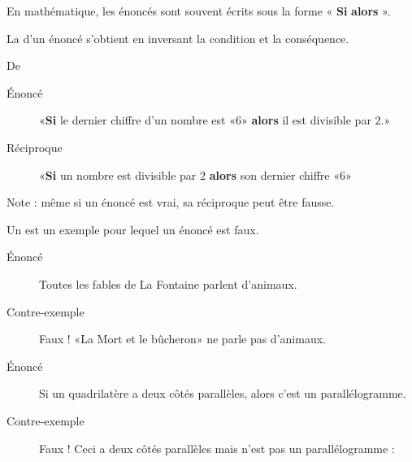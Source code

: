 
En mathématique, les énoncés sont souvent écrits sous la forme « {\bf Si}  {\bf alors} ».

\begin{definition}
    La  d'un énoncé s'obtient en inversant la condition et la conséquence.
\end{definition}
De \cite{XEFooQxuWQb}

\begin{example}
    \begin{description}
        \item[Énoncé] «{\bf Si} le dernier chiffre d'un nombre est «\( 6\)» {\bf alors} il est divisible par \( 2\).» 
        \item[Réciproque] «{\bf Si} un nombre est divisible par \( 2\) {\bf alors} son dernier chiffre «\( 6\)» 
    \end{description}
    Note : même si un énoncé est vrai, sa réciproque peut être fausse.
\end{example}

\begin{definition}
    Un  est un exemple pour lequel un énoncé est faux.
\end{definition}

\begin{example}
    \begin{description}
        \item[Énoncé] Toutes les fables de La Fontaine parlent d'animaux.
        \item[Contre-exemple] Faux ! «La Mort et le bûcheron» ne parle pas d'animaux.
    \end{description}
\end{example}

\begin{example}
    \begin{description}
        \item[Énoncé] Si un quadrilatère a deux côtés parallèles, alors c'est un parallélogramme.
        \item[Contre-exemple] Faux ! Ceci a deux côtés parallèles mais n'est pas un parallélogramme :
            \begin{center}
               
            \end{center}
    \end{description}
\end{example}


\begin{multicols}{2}
\end{multicols}

